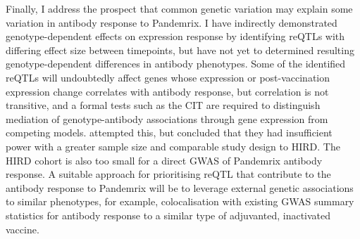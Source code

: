 Finally, I address the prospect that common genetic variation may explain some variation in antibody response to Pandemrix.
I have indirectly demonstrated genotype-dependent effects on expression response by identifying reQTLs with differing effect size between timepoints,
but have not yet to determined resulting genotype-dependent differences in antibody phenotypes.
Some of the identified reQTLs will undoubtedly affect genes whose expression or post-vaccination expression change correlates with antibody response, 
but correlation is not transitive\autocite{langford2001PropertyBeingPositively},
and a formal tests such as the \gls{CIT}\autocite{millstein2009DisentanglingMolecularRelationships} are required to distinguish mediation of genotype-antibody associations through gene expression from competing models.
\autocite{franco2013IntegrativeGenomicAnalysis} attempted this, but concluded that they had insufficient power with a greater sample size and comparable study design to \gls{HIRD}.
The \gls{HIRD} cohort is also too small for a direct \gls{GWAS} of Pandemrix antibody response.
A suitable approach for prioritising reQTL that contribute to the antibody response to Pandemrix will be to leverage external genetic associations to similar phenotypes,
for example, colocalisation with existing GWAS summary statistics for antibody response to a similar type of adjuvanted, inactivated vaccine.

